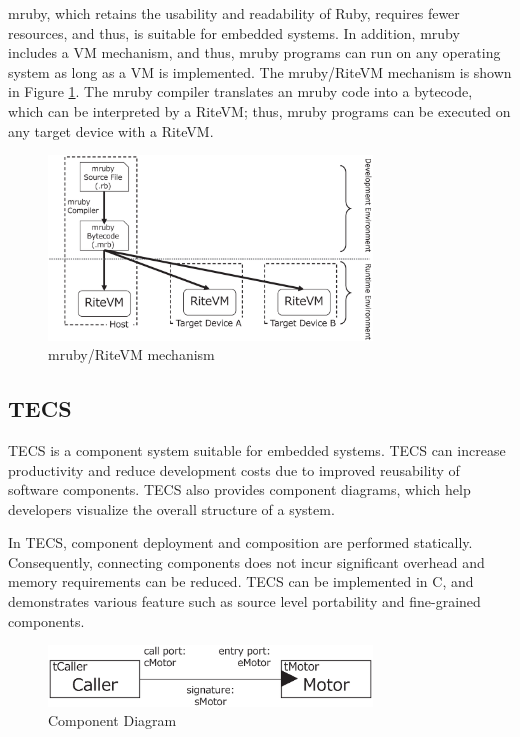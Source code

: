 \documentclass{sig-alternate-05-2015}
\begin{document}
mruby, which retains the usability and readability of Ruby, requires fewer resources, and thus, is suitable for embedded systems.
In addition, mruby includes a VM mechanism, and thus, mruby programs can run on any operating system as long as a VM is implemented.
The mruby/RiteVM mechanism is shown in Figure \ref{fig:mruby}.
The mruby compiler translates an mruby code into a bytecode, which can be interpreted by a RiteVM; thus, mruby programs can be executed on any target device with a RiteVM.
\begin{figure}[t]
    \centering
    \includegraphics[width=8.6cm,clip]{figure/mruby.eps}
    \vspace{0.5mm}
    \caption{mruby/RiteVM mechanism}
    \vspace{1mm}
    \label{fig:mruby}
\end{figure}

\subsection{TECS}
\label{sec:TECS}
TECS is a component system suitable for embedded systems.
TECS can increase productivity and reduce development costs due to improved reusability of software components.
TECS also provides component diagrams, which help developers visualize the overall structure of a system.

In TECS, component deployment and composition are performed statically.
Consequently, connecting components does not incur significant overhead and memory requirements can be reduced.
TECS can be implemented in C, and demonstrates various feature such as source level portability and fine-grained components.

\begin{figure}[t]
    \centering
    \includegraphics[width=8.6cm,clip]{figure/component_diagram.eps}
    \caption{Component Diagram}
    \vspace{1mm}
    \label{fig:component}
\end{figure}
\end{document}
